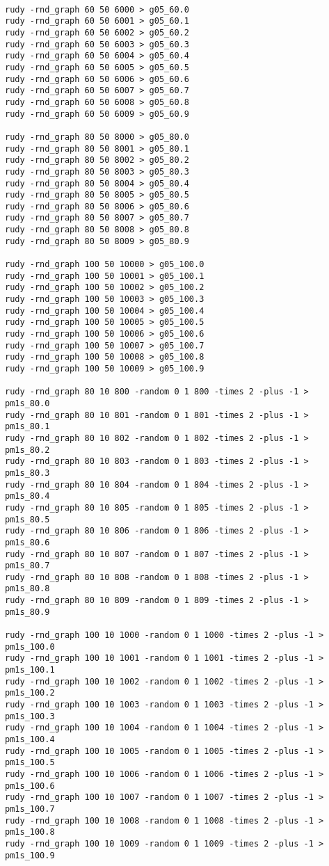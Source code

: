 \documentclass[a4paper, 12pt]{article}
\begin{document}
\begin{tiny}
\noindent
\begin{verbatim}   
 
rudy -rnd_graph 60 50 6000 > g05_60.0
rudy -rnd_graph 60 50 6001 > g05_60.1
rudy -rnd_graph 60 50 6002 > g05_60.2
rudy -rnd_graph 60 50 6003 > g05_60.3
rudy -rnd_graph 60 50 6004 > g05_60.4
rudy -rnd_graph 60 50 6005 > g05_60.5
rudy -rnd_graph 60 50 6006 > g05_60.6
rudy -rnd_graph 60 50 6007 > g05_60.7
rudy -rnd_graph 60 50 6008 > g05_60.8
rudy -rnd_graph 60 50 6009 > g05_60.9

rudy -rnd_graph 80 50 8000 > g05_80.0
rudy -rnd_graph 80 50 8001 > g05_80.1
rudy -rnd_graph 80 50 8002 > g05_80.2
rudy -rnd_graph 80 50 8003 > g05_80.3
rudy -rnd_graph 80 50 8004 > g05_80.4
rudy -rnd_graph 80 50 8005 > g05_80.5
rudy -rnd_graph 80 50 8006 > g05_80.6
rudy -rnd_graph 80 50 8007 > g05_80.7
rudy -rnd_graph 80 50 8008 > g05_80.8
rudy -rnd_graph 80 50 8009 > g05_80.9

rudy -rnd_graph 100 50 10000 > g05_100.0
rudy -rnd_graph 100 50 10001 > g05_100.1
rudy -rnd_graph 100 50 10002 > g05_100.2
rudy -rnd_graph 100 50 10003 > g05_100.3
rudy -rnd_graph 100 50 10004 > g05_100.4
rudy -rnd_graph 100 50 10005 > g05_100.5
rudy -rnd_graph 100 50 10006 > g05_100.6
rudy -rnd_graph 100 50 10007 > g05_100.7
rudy -rnd_graph 100 50 10008 > g05_100.8
rudy -rnd_graph 100 50 10009 > g05_100.9

rudy -rnd_graph 80 10 800 -random 0 1 800 -times 2 -plus -1 > pm1s_80.0
rudy -rnd_graph 80 10 801 -random 0 1 801 -times 2 -plus -1 > pm1s_80.1
rudy -rnd_graph 80 10 802 -random 0 1 802 -times 2 -plus -1 > pm1s_80.2
rudy -rnd_graph 80 10 803 -random 0 1 803 -times 2 -plus -1 > pm1s_80.3
rudy -rnd_graph 80 10 804 -random 0 1 804 -times 2 -plus -1 > pm1s_80.4
rudy -rnd_graph 80 10 805 -random 0 1 805 -times 2 -plus -1 > pm1s_80.5
rudy -rnd_graph 80 10 806 -random 0 1 806 -times 2 -plus -1 > pm1s_80.6
rudy -rnd_graph 80 10 807 -random 0 1 807 -times 2 -plus -1 > pm1s_80.7
rudy -rnd_graph 80 10 808 -random 0 1 808 -times 2 -plus -1 > pm1s_80.8
rudy -rnd_graph 80 10 809 -random 0 1 809 -times 2 -plus -1 > pm1s_80.9

rudy -rnd_graph 100 10 1000 -random 0 1 1000 -times 2 -plus -1 > pm1s_100.0
rudy -rnd_graph 100 10 1001 -random 0 1 1001 -times 2 -plus -1 > pm1s_100.1
rudy -rnd_graph 100 10 1002 -random 0 1 1002 -times 2 -plus -1 > pm1s_100.2
rudy -rnd_graph 100 10 1003 -random 0 1 1003 -times 2 -plus -1 > pm1s_100.3
rudy -rnd_graph 100 10 1004 -random 0 1 1004 -times 2 -plus -1 > pm1s_100.4
rudy -rnd_graph 100 10 1005 -random 0 1 1005 -times 2 -plus -1 > pm1s_100.5
rudy -rnd_graph 100 10 1006 -random 0 1 1006 -times 2 -plus -1 > pm1s_100.6
rudy -rnd_graph 100 10 1007 -random 0 1 1007 -times 2 -plus -1 > pm1s_100.7
rudy -rnd_graph 100 10 1008 -random 0 1 1008 -times 2 -plus -1 > pm1s_100.8
rudy -rnd_graph 100 10 1009 -random 0 1 1009 -times 2 -plus -1 > pm1s_100.9


\end{verbatim}
\end{tiny}
\end{document}
